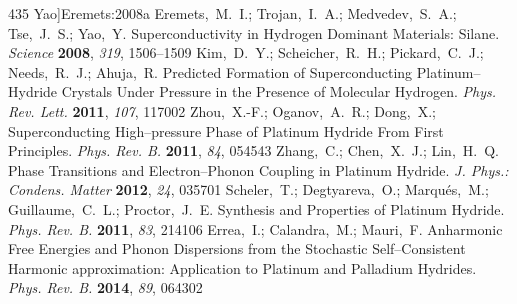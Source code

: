 \documentclass[12pt,letterpaper,oneside]{article}
\begin{document}
\begin{mcitethebibliography}{435}
  Yao]{Eremets:2008a}
Eremets,~M.~I.; Trojan,~I.~A.; Medvedev,~S.~A.; Tse,~J.~S.; Yao,~Y.
  Superconductivity in Hydrogen Dominant Materials: Silane. \emph{Science}
  \textbf{2008}, \emph{319}, 1506--1509\relax
\mciteBstWouldAddEndPuncttrue
\mciteSetBstMidEndSepPunct{\mcitedefaultmidpunct}
{\mcitedefaultendpunct}{\mcitedefaultseppunct}\relax
\EndOfBibitem
{}
Kim,~D.~Y.; Scheicher,~R.~H.; Pickard,~C.~J.; Needs,~R.~J.; Ahuja,~R. Predicted
  Formation of Superconducting Platinum--Hydride Crystals Under Pressure in the
  Presence of Molecular Hydrogen. \emph{Phys. Rev. Lett.} \textbf{2011},
  \emph{107}, 117002\relax
\mciteBstWouldAddEndPuncttrue
\mciteSetBstMidEndSepPunct{\mcitedefaultmidpunct}
{\mcitedefaultendpunct}{\mcitedefaultseppunct}\relax
\EndOfBibitem
{}
Zhou,~X.-F.; Oganov,~A.~R.; Dong,~X.; 
  Superconducting High--pressure Phase of Platinum Hydride From First
  Principles. \emph{Phys. Rev. B.} \textbf{2011}, \emph{84}, 054543\relax
\mciteBstWouldAddEndPuncttrue
\mciteSetBstMidEndSepPunct{\mcitedefaultmidpunct}
{\mcitedefaultendpunct}{\mcitedefaultseppunct}\relax
\EndOfBibitem
{}
Zhang,~C.; Chen,~X.~J.; Lin,~H.~Q. Phase Transitions and Electron--Phonon
  Coupling in Platinum Hydride. \emph{J. Phys.: Condens. Matter} \textbf{2012},
  \emph{24}, 035701\relax
\mciteBstWouldAddEndPuncttrue
\mciteSetBstMidEndSepPunct{\mcitedefaultmidpunct}
{\mcitedefaultendpunct}{\mcitedefaultseppunct}\relax
\EndOfBibitem
{}
Scheler,~T.; Degtyareva,~O.; Marqu{\'e}s,~M.; Guillaume,~C.~L.; Proctor,~J.~E.
    Synthesis and Properties of Platinum Hydride. \emph{Phys.
  Rev. B.} \textbf{2011}, \emph{83}, 214106\relax
\mciteBstWouldAddEndPuncttrue
\mciteSetBstMidEndSepPunct{\mcitedefaultmidpunct}
{\mcitedefaultendpunct}{\mcitedefaultseppunct}\relax
\EndOfBibitem
{}
Errea,~I.; Calandra,~M.; Mauri,~F. Anharmonic Free Energies and Phonon
  Dispersions from the Stochastic Self--Consistent Harmonic approximation:
  Application to Platinum and Palladium Hydrides. \emph{Phys. Rev. B.}
  \textbf{2014}, \emph{89}, 064302\relax
\mciteBstWouldAddEndPuncttrue
\mciteSetBstMidEndSepPunct{\mcitedefaultmidpunct}
{\mcitedefaultendpunct}{\mcitedefaultseppunct}\relax

\end{mcitethebibliography}
\end{document}
